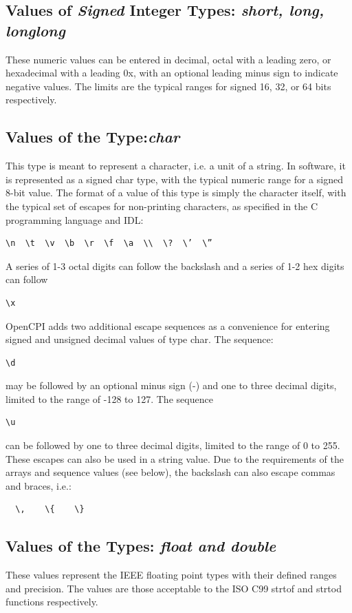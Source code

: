 \documentclass[10pt, a4paper, oneside]{article}
\renewcommand\_{\textunderscore\allowbreak} %
\begin{document}
{\subsection{Values of \emph{Signed} Integer Types: \emph{short, long, longlong}} These numeric values can be entered in decimal, octal with a leading zero, or hexadecimal with a leading 0x, with an optional leading minus sign to indicate negative values.  The limits are the typical ranges for signed 16, 32, or 64 bits respectively.
\subsection{Values of the Type:\emph{char}}This type is meant to represent a character, i.e. a unit of a string.  In software, it is represented as a signed char type, with the typical numeric range for a signed 8-bit value. The format of a value of this type is simply the character itself, with the typical set of escapes for non-printing characters, as specified in the C programming language and IDL:\begin{verbatim}
\n  \t  \v  \b  \r  \f  \a  \\  \?  \’  \”  \end{verbatim}
A series of 1-3 octal digits can follow the backslash and a series of 1-2 hex digits can follow \begin{verbatim}\x\end{verbatim} OpenCPI adds two additional escape sequences as a convenience for entering signed and unsigned decimal values of type char. The sequence:\begin{verbatim}\d \end{verbatim}may be followed by an optional minus sign (-) and one to three decimal digits, limited to the range of -128 to 127.  The sequence \begin{verbatim}\u \end{verbatim} can be followed by one to three decimal digits, limited to the range of 0 to 255. These escapes can also be used in a string value. Due to the requirements of the arrays and sequence values (see below), the backslash can also escape commas and braces, i.e.: \begin{verbatim}  \,    \{    \} \end{verbatim}  
\subsection{Values of the Types:  \emph{float and double}}These values represent the IEEE floating point types with their defined ranges and precision.  The values are those acceptable to the ISO C99 {strtof and strtod} functions respectively.
}
\end{document}
